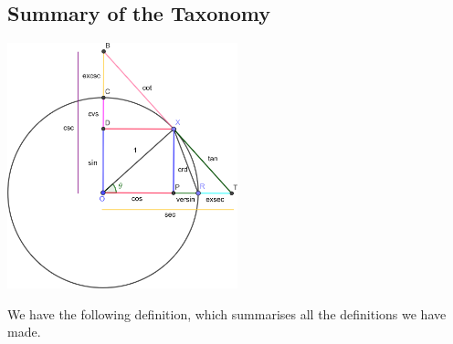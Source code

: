 \documentclass[a4paper,leqno]{article}
\numberwithin{equation}{section}
\theoremstyle{definition}
\theoremstyle{remark}
\begin{document}
\subsection{Summary of the Taxonomy}
\begin{center}
  \includegraphics[width=0.5\textwidth]{taxonomyall}
\end{center}
We have the following definition, which summarises all the definitions we have made.
\end{document}
